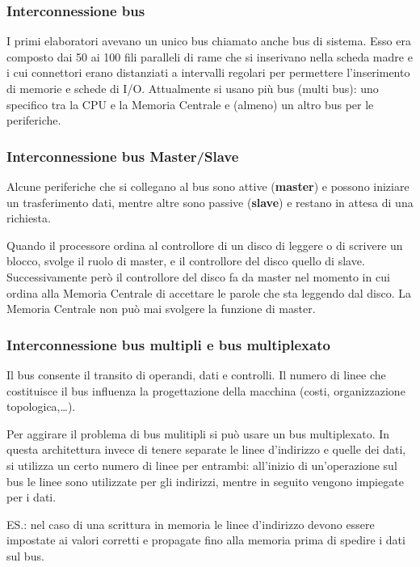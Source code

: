 \documentclass[12pt]{article}
\begin{document}
\subsubsection{Interconnessione bus}
I primi elaboratori avevano un unico bus chiamato anche bus di sistema. Esso era composto dai 50 ai 100 fili paralleli di rame che si inserivano nella scheda madre e i cui connettori erano distanziati a intervalli regolari per permettere l’inserimento di memorie e schede
di I/O. Attualmente si usano più bus (multi bus): uno specifico tra la CPU e la Memoria Centrale e (almeno) un altro bus per le periferiche.\par\medskip\noindent 
\subsubsection{Interconnessione bus Master/Slave}
Alcune periferiche che si collegano al bus sono attive (\textbf{master}) e possono iniziare un trasferimento dati, mentre altre sono passive (\textbf{slave}) e restano in attesa di una richiesta. \par\medskip\noindent
Quando il processore ordina al controllore di un disco di leggere o di scrivere un blocco, svolge il ruolo di master, e il controllore del disco quello di slave. Successivamente però il controllore
del disco fa da master nel momento in cui ordina alla Memoria Centrale di accettare le parole che sta leggendo dal disco. La Memoria Centrale non può mai svolgere la funzione di master.\par\medskip\noindent
\subsubsection{Interconnessione bus multipli e bus multiplexato}
Il bus consente il transito di operandi, dati e controlli. Il numero di linee che costituisce il bus influenza la progettazione della macchina (costi, organizzazione topologica,…). \par\medskip\noindent
Per aggirare il problema di bus mulitipli si può usare un bus multiplexato. In questa architettura invece di tenere separate le linee d’indirizzo e quelle dei dati, si utilizza un certo numero di linee per entrambi: all’inizio di un’operazione sul bus le linee sono utilizzate per gli indirizzi, mentre in seguito vengono impiegate per i dati.\par\medskip\noindent
ES.: nel caso di una scrittura in memoria le linee d’indirizzo devono essere impostate ai valori corretti e propagate fino alla memoria prima di spedire i dati sul bus.
\end{document}
